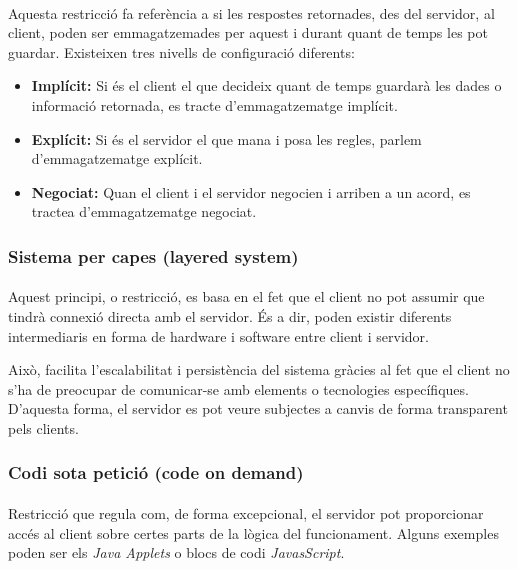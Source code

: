     \paragraph{}
    Aquesta restricció fa referència a si les respostes retornades, des del servidor, al client, poden ser emmagatzemades per aquest i durant quant de temps les pot guardar. Existeixen tres nivells de configuració diferents:

    \begin{itemize}
        \item \textbf{Implícit:} Si és el client el que decideix quant de temps guardarà les dades o informació retornada, es tracte d'emmagatzematge implícit.
        \item \textbf{Explícit:} Si és el servidor el que mana i posa les regles, parlem d'emmagatzematge explícit.
        \item \textbf{Negociat:} Quan el client i el servidor negocien i arriben a un acord, es tractea d'emmagatzematge negociat.
    \end{itemize}


    \subsubsection{Sistema per capes (layered system)}

    \paragraph{}
    Aquest principi, o restricció, es basa en el fet que el client no pot assumir que tindrà connexió directa amb el servidor. És a dir, poden existir diferents intermediaris en forma de hardware i software entre client i servidor.

    Això, facilita l’escalabilitat i persistència del sistema gràcies al fet que el client no s’ha de preocupar de comunicar-se amb elements o tecnologies específiques. D'aquesta forma, el servidor es pot veure subjectes a canvis de forma transparent pels clients.


    \subsubsection{Codi sota petició (code on demand)}

    \paragraph{}
    Restricció que regula com, de forma excepcional, el servidor pot proporcionar accés al client sobre certes parts de la lògica del funcionament. Alguns exemples poden ser els \emph{Java Applets} o blocs de codi \emph{JavasScript}.
